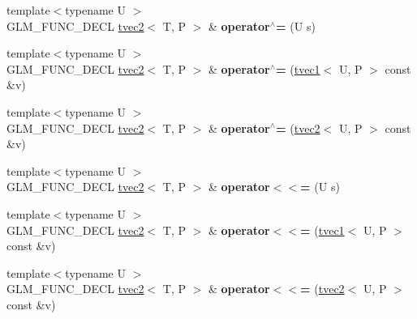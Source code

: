 \begin{DoxyCompactItemize}
\item 
\hypertarget{structglm_1_1tvec2_a35a65b1287ee0ef3d77813e85bda9b79}{{\footnotesize template$<$typename U $>$ }\\G\-L\-M\-\_\-\-F\-U\-N\-C\-\_\-\-D\-E\-C\-L \hyperlink{structglm_1_1tvec2}{tvec2}$<$ T, P $>$ \& {\bfseries operator$^\wedge$=} (U s)}\label{structglm_1_1tvec2_a35a65b1287ee0ef3d77813e85bda9b79}

\item 
\hypertarget{structglm_1_1tvec2_a50b26c0a009d0ed134ae0984da6d50ab}{{\footnotesize template$<$typename U $>$ }\\G\-L\-M\-\_\-\-F\-U\-N\-C\-\_\-\-D\-E\-C\-L \hyperlink{structglm_1_1tvec2}{tvec2}$<$ T, P $>$ \& {\bfseries operator$^\wedge$=} (\hyperlink{structglm_1_1tvec1}{tvec1}$<$ U, P $>$ const \&v)}\label{structglm_1_1tvec2_a50b26c0a009d0ed134ae0984da6d50ab}

\item 
\hypertarget{structglm_1_1tvec2_ac1398d1c0dbada005b4ed27a9a568c28}{{\footnotesize template$<$typename U $>$ }\\G\-L\-M\-\_\-\-F\-U\-N\-C\-\_\-\-D\-E\-C\-L \hyperlink{structglm_1_1tvec2}{tvec2}$<$ T, P $>$ \& {\bfseries operator$^\wedge$=} (\hyperlink{structglm_1_1tvec2}{tvec2}$<$ U, P $>$ const \&v)}\label{structglm_1_1tvec2_ac1398d1c0dbada005b4ed27a9a568c28}

\item 
\hypertarget{structglm_1_1tvec2_a05e705c90dcf562bf2cd0c112a91a129}{{\footnotesize template$<$typename U $>$ }\\G\-L\-M\-\_\-\-F\-U\-N\-C\-\_\-\-D\-E\-C\-L \hyperlink{structglm_1_1tvec2}{tvec2}$<$ T, P $>$ \& {\bfseries operator$<$$<$=} (U s)}\label{structglm_1_1tvec2_a05e705c90dcf562bf2cd0c112a91a129}

\item 
\hypertarget{structglm_1_1tvec2_a8f293425e914a1d7964907a89f6b492d}{{\footnotesize template$<$typename U $>$ }\\G\-L\-M\-\_\-\-F\-U\-N\-C\-\_\-\-D\-E\-C\-L \hyperlink{structglm_1_1tvec2}{tvec2}$<$ T, P $>$ \& {\bfseries operator$<$$<$=} (\hyperlink{structglm_1_1tvec1}{tvec1}$<$ U, P $>$ const \&v)}\label{structglm_1_1tvec2_a8f293425e914a1d7964907a89f6b492d}

\item 
\hypertarget{structglm_1_1tvec2_ad02c6fdf1c56884b2a65bf9135a28870}{{\footnotesize template$<$typename U $>$ }\\G\-L\-M\-\_\-\-F\-U\-N\-C\-\_\-\-D\-E\-C\-L \hyperlink{structglm_1_1tvec2}{tvec2}$<$ T, P $>$ \& {\bfseries operator$<$$<$=} (\hyperlink{structglm_1_1tvec2}{tvec2}$<$ U, P $>$ const \&v)}\label{structglm_1_1tvec2_ad02c6fdf1c56884b2a65bf9135a28870}


\end{DoxyCompactItemize}
